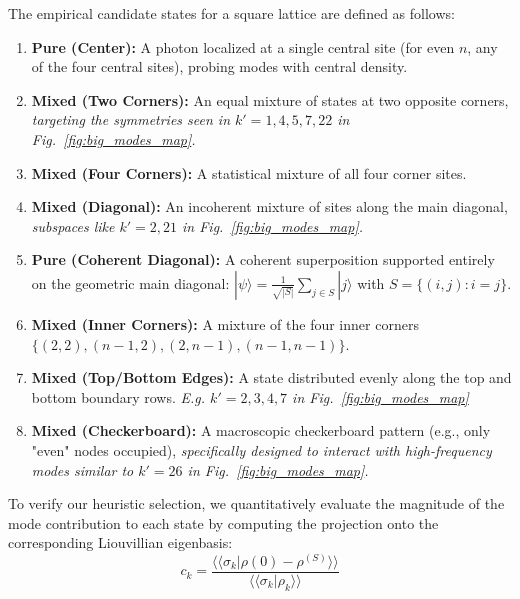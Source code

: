 \documentclass[pdflatex,sn-mathphys-num]{sn-jnl}
\begin{document}
The empirical candidate states for a square lattice are defined as follows:\\
\begin{enumerate}
    \item \textbf{Pure (Center):} A photon localized at a single central site (for even $n$, any of the four central sites), probing modes with central density.
    \item \textbf{Mixed (Two Corners):} An equal mixture of states at two opposite corners, \textit{targeting the symmetries seen in $k'=1, 4, 5, 7, 22$ in Fig.~\ref{fig:big_modes_map}.}
    \item \textbf{Mixed (Four Corners):} A statistical mixture of all four corner sites.
    \item \textbf{Mixed (Diagonal):} An incoherent mixture of sites along the main diagonal, \textit{subspaces like $k'=2, 21$ in Fig.~\ref{fig:big_modes_map}.}
    \item \textbf{Pure (Coherent Diagonal):} A coherent superposition supported entirely on the geometric main diagonal: $|\psi\rangle = \frac{1}{\sqrt{|S|}}\sum_{j\in S}|j\rangle$ with $S = \{(i, j) : i = j\}$.
    \item \textbf{Mixed (Inner Corners):} A mixture of the four inner corners $\{(2, 2), (n-1, 2), (2, n-1), (n-1, n-1)\}$.
    \item \textbf{Mixed (Top/Bottom Edges):} A state distributed evenly along the top and bottom boundary rows. \textit{E.g. $k'=2,3,4,7$ in Fig.~\ref{fig:big_modes_map}}
    \item \textbf{Mixed (Checkerboard):} A macroscopic checkerboard pattern (e.g., only "even" nodes occupied), \textit{specifically designed to interact with high-frequency modes similar to $k'=26$ in Fig.~\ref{fig:big_modes_map}.}

\end{enumerate}




To verify our heuristic selection, we quantitatively evaluate the magnitude of the mode contribution to each state by computing the projection onto the corresponding Liouvillian eigenbasis:
\begin{equation}
c_k = \frac{\langle\langle\sigma_k | \rho(0) - \rho^{(S)}\rangle\rangle}{\langle\langle\sigma_k | \rho_k\rangle\rangle}
\label{eq:c_k}
\end{equation}
\end{document}

